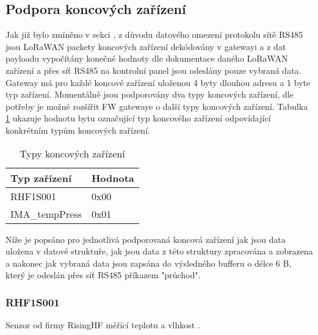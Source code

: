 \subsection{Podpora koncových zařízení}
Jak již bylo zmíněno v sekci \label{Implementace WSN do přístupového systému}, z důvodu datového omezení protokolu sítě RS485 jsou LoRaWAN packety koncových zařízení dekódovány v gatewayi a z dat payloadu vypočítány konečné hodnoty dle dokumentace daného LoRaWAN zařízení a přes síť RS485 na kontrolní panel jsou odeslány pouze vybraná data. Gateway má pro každé koncové zařízení uloženou 4 byty dlouhou adresu a 1 byte typ zařízení.
Momentálně jsou podporovány dva typy koncových zařízení, dle potřeby je možné rozšířit FW gatewaye o další typy koncových zařízení. Tabulka \ref{table:TypyKoncZarizeni} ukazuje hodnotu bytu označující typ koncového zařízení odpovídající konkrétním typům koncových zařízení.

\begin{table}[!h]
    \centering
    \begin{ctucolortab}
    \begin{tabular}{ |l|l| }
     \hline

     Typ zařízení       & Hodnota         \\ \hline \hline
     RHF1S001           & 0x00            \\ \hline
     IMA\_tempPress     & 0x01            \\ \hline
     
    \end{tabular}
    \end{ctucolortab}
    \caption{Typy koncových zařízení}
    \label{table:TypyKoncZarizeni}
\end{table}

Níže je popsáno pro jednotlivá podporovaná koncová zařízení jak jsou data uložena v datové struktuře, jak jsou data z této struktury zpracována a zobrazena a nakonec jak vybraná data jsou zapsána do výsledného bufferu o délce 6 B, který je odeslán přes síť RS485 příkazem "průchod".


\subsubsection{RHF1S001}
Senzor od firmy RisingHF měřící teplotu a vlhkost \cite{RHF1S001 pdf}.

